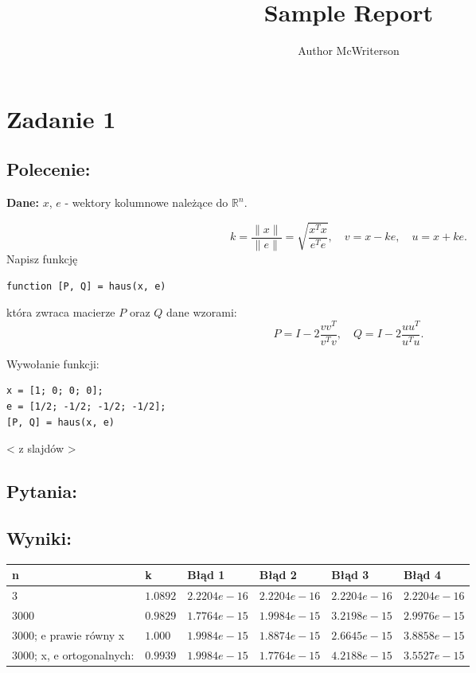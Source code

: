 \documentclass[a4paper, 11pt]{article}
\title{Sample Report}
\author{Author McWriterson}
\begin{document}
\maketitle
\tableofcontents

\section{Zadanie 1}
\subsection{Polecenie:}
\noindent \textbf{Dane:} \( x \), \( e \) - wektory kolumnowe należące do \( \mathbb{R}^n \).

\[
k = \frac{\|x\|}{\|e\|} = \sqrt{\frac{x^T x}{e^T e}}, \quad v = x - k e, \quad u = x + k e.
\]
 Napisz funkcję
\begin{center}
\begin{verbatim}
function [P, Q] = haus(x, e)
\end{verbatim}
\end{center}
która zwraca macierze \( P \) oraz \( Q \) dane wzorami:
\[
P = I - 2 \frac{v v^T}{v^T v}, \quad Q = I - 2 \frac{u u^T}{u^T u}.
\]

Wywołanie funkcji:
\begin{center}
\begin{verbatim}
x = [1; 0; 0; 0];
e = [1/2; -1/2; -1/2; -1/2];
[P, Q] = haus(x, e)
\end{verbatim}
\end{center}
< z slajdów > 
\subsection{Pytania:} 

\subsection{Wyniki:} 
\begin{center}
\begin{tabular}{@{}|l|l|l|l|l|l|@{}}
\toprule
n                         & k      & Błąd 1      & Błąd 2      & Błąd 3      & Błąd 4      \\ \hline
3                         &$ 1.0892$ & $2.2204 e-16$ & $2.2204 e-16$ & $2.2204 e-16$ & $2.2204 e-16$ \\ \hline
3000                      & $0.9829$ & $1.7764 e-15$ & $1.9984 e-15$ & $3.2198 e-15$ & $2.9976 e-15$ \\ \hline
3000; e prawie równy x    &$ 1.000$  & $1.9984 e-15$ & $1.8874 e-15$ &$ 2.6645 e-15$ & $3.8858 e-15$ \\ \hline
3000; x, e ortogonalnych: & $0.9939$ & $1.9984 e-15$ & $1.7764 e-15$ & $4.2188 e-15$ & $3.5527 e-15$ \\ \hline
\end{tabular}
\end{center}
\end{document}
